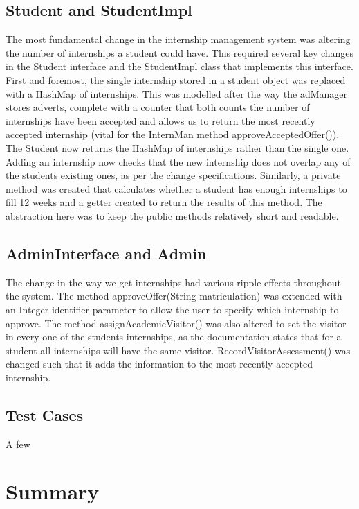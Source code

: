 \documentclass[11pt]{l3deliverable}
\begin{document}
\subsection{Student and StudentImpl}

The most fundamental change in the internship management system was altering the
number of internships a student could have. This required several key changes
in the Student interface and the StudentImpl class that implements this interface.
First and foremost, the single internship stored in a student object was replaced 
with a HashMap of internships. This was modelled after the way the adManager stores
adverts, complete with a counter that both counts the number of internships have been 
accepted and allows us to return the most recently accepted internship (vital for the 
InternMan method approveAcceptedOffer()). The Student now returns the HashMap of 
internships rather than the single one. Adding an internship now checks that the new
internship does not overlap any of the students existing ones, as per the change 
specifications. Similarly, a private method was created that calculates whether a
student has enough internships to fill 12 weeks and a getter created to return the 
results of this method. The abstraction here was to keep the public methods relatively
short and readable.

\subsection{AdminInterface and Admin}

The change in the way we get internships had various ripple effects throughout the 
system. The method approveOffer(String matriculation) was extended with an Integer
identifier parameter to allow the user to specify which internship to approve. The 
method assignAcademicVisitor() was also altered to set the visitor in every one of
the students internships, as the documentation states that for a student all 
internships will have the same visitor. RecordVisitorAssessment() was changed such
that it adds the information to the most recently accepted internship.

\subsection{Test Cases}

A few

\section{Summary}
\end{document}
